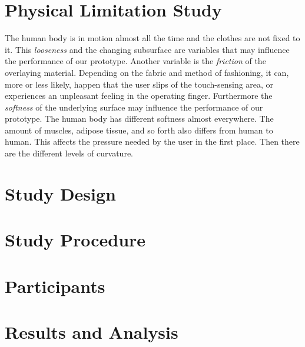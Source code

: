 \section{Physical Limitation Study}
The human body is in motion almost all the time and the clothes are not fixed to it. This \emph{looseness} and the changing subsurface are variables that may influence the performance of our prototype. Another variable is the \emph{friction} of the overlaying material. Depending on the fabric and method of fashioning, it can, more or less likely, happen that the user slips of the touch-sensing area, or experiences an unpleasant feeling in the operating finger. Furthermore the \emph{softness} of the underlying surface may influence the performance of our prototype. The human body has different softness almost everywhere. The amount of muscles, adipose tissue, and so forth also differs from human to human. This affects the pressure needed by the user in the first place. Then there are the different levels of curvature. 

\section{Study Design}

\section{Study Procedure}

\section{Participants}

\section{Results and Analysis}

